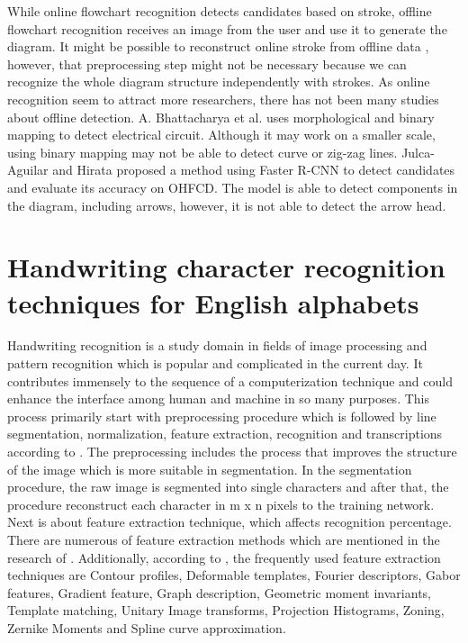 While online flowchart recognition detects candidates based on stroke, offline flowchart recognition receives an image from the user and use it to generate the diagram. It might be possible to reconstruct online stroke from offline data \cite{53}, however, that preprocessing step might not be necessary because we can recognize the whole diagram structure independently with strokes. As online recognition seem to attract more researchers, there has not been many studies about offline detection. A. Bhattacharya et al. \cite{54} uses morphological and binary mapping to detect electrical circuit. Although it may work on a smaller scale, using binary mapping may not be able to detect curve or zig-zag lines. Julca-Aguilar and Hirata proposed a method using Faster R-CNN to detect candidates and evaluate its accuracy on OHFCD. The model is able to detect components in the diagram, including arrows, however, it is not able to detect the arrow head. 
\section{Handwriting character recognition techniques for English alphabets} 
Handwriting recognition is a study domain in fields of image processing and pattern recognition which is popular and complicated in the current day. It contributes immensely to the
sequence of a computerization technique and could enhance the interface among human and machine in so many purposes. This process primarily start with preprocessing procedure which is followed by line segmentation, normalization, feature extraction, recognition and transcriptions according to \cite{12}. The preprocessing includes the process that improves the structure of the image which is more suitable in segmentation. In the segmentation procedure, the raw image is segmented into single characters and after that, the procedure reconstruct each character in m x n pixels to the training network. Next is about feature extraction technique, which affects recognition percentage. There are numerous of feature extraction methods which are mentioned in the research of \cite{13}. Additionally, according to \cite{12}, the frequently used feature extraction techniques are Contour profiles, Deformable templates, Fourier descriptors, Gabor
features, Gradient feature, Graph description, Geometric moment invariants, Template matching, Unitary Image transforms, Projection Histograms, Zoning, Zernike Moments and Spline curve approximation.
